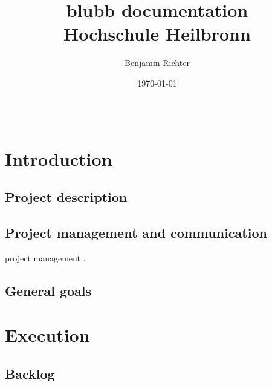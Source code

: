 \documentclass[12pt,a4paper,oneside]{report}
\newcommand{\appname}{blubb}
\begin{document}
\begin{lstlisting}
\end{lstlisting}
%
\title{
	{\huge \appname{} documentation}
	{\\ \large Hochschule Heilbronn}
}
\author{Benjamin Richter}
\date{\today}
\maketitle
\tableofcontents

\chapter{Introduction}

\section{Project description}

\section{Project management and communication}
project management \citep{mihaela2013measurement}. 


\section{General goals}


\chapter{Execution}

\section{Backlog}
\end{document}
